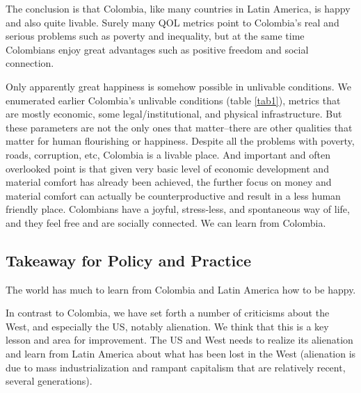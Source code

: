 \documentclass[10pt, letterpaper]{article}
\begin{document}
\begin{spacing}{2}
The conclusion is that Colombia, like many countries in Latin America, 
 is happy and also quite livable. Surely many QOL metrics point to Colombia's real
and serious problems such as poverty and inequality, but at the same time Colombians enjoy %
great advantages such as positive freedom and social connection.

Only apparently great happiness is somehow possible in unlivable conditions. 
 We enumerated earlier Colombia's unlivable conditions (table \ref{tab1}),
 metrics that are mostly economic, some legal/institutional, and physical
 infrastructure. 
 But
 these parameters are not the only ones that matter--there
 are other qualities that matter for human flourishing or happiness. 
Despite all the problems with poverty, roads, corruption, etc, Colombia is a livable place.
 And important and often overlooked point is that given very basic level of
 economic development and material comfort has already been achieved, the
 further focus on money and material comfort can actually be counterproductive
 and result in a less human friendly place. %
 Colombians have a  joyful, stress-less, and spontaneous way of life,
 and they feel free and are socially connected.  
 We can learn from Colombia. %
 


\subsection{Takeaway for Policy and Practice}

The world has much to learn from Colombia and Latin America how to be happy. 

In contrast to Colombia, we have set forth a number of criticisms about the
West, and especially the US, notably alienation. We think that this is a key
lesson and area for improvement. The US and West needs to realize its alienation
and learn from Latin America about what has been lost in the West (alienation is due to
mass industrialization and rampant capitalism that are relatively recent, several generations).


\end{spacing}
\end{document}
